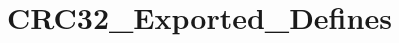 \hypertarget{group___c_r_c32___exported___defines}{}\section{C\+R\+C32\+\_\+\+Exported\+\_\+\+Defines}
\label{group___c_r_c32___exported___defines}
